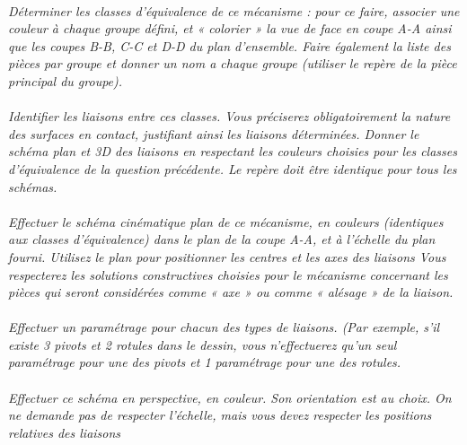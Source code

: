 \documentclass[11pt,oneside]{article}
\begin{document}
\paragraph{}
\textit{Déterminer les classes d'équivalence de ce mécanisme : pour ce faire, associer une couleur à chaque groupe défini, et « colorier » la vue de face en coupe A-A ainsi que les coupes B-B, C-C et D-D du plan d'ensemble. Faire également la liste des pièces par groupe et donner un nom a chaque groupe (utiliser le repère de la pièce principal du groupe).}

\paragraph{}
\textit{Identifier les liaisons entre ces classes. Vous préciserez obligatoirement la nature des surfaces en contact, justifiant ainsi les liaisons déterminées. Donner le schéma plan et 3D des liaisons en respectant les couleurs choisies pour les classes d'équivalence de la question précédente. Le repère doit être identique pour tous les schémas.}
			
\paragraph{}
\textit{Effectuer le schéma cinématique plan de ce mécanisme, en couleurs (identiques aux classes d'équivalence) dans le plan de la coupe A-A, et à l'échelle du plan fourni.
 Utilisez  le plan pour positionner les centres et les axes des liaisons 
 Vous respecterez les solutions constructives choisies pour le mécanisme concernant les pièces qui seront considérées comme « axe » ou comme « alésage » de la liaison.}


\paragraph{}
\textit{Effectuer un paramétrage pour chacun des types de liaisons. (Par exemple, s'il existe 3 pivots et 2 rotules dans le dessin, vous n'effectuerez qu'un seul paramétrage pour une des pivots et 1 paramétrage pour une des rotules.}


\paragraph{}
\textit{Effectuer ce schéma en perspective, en couleur.
 Son orientation est au choix.
 On ne demande pas de respecter l'échelle, mais vous devez respecter les positions relatives des liaisons}
\end{document}
